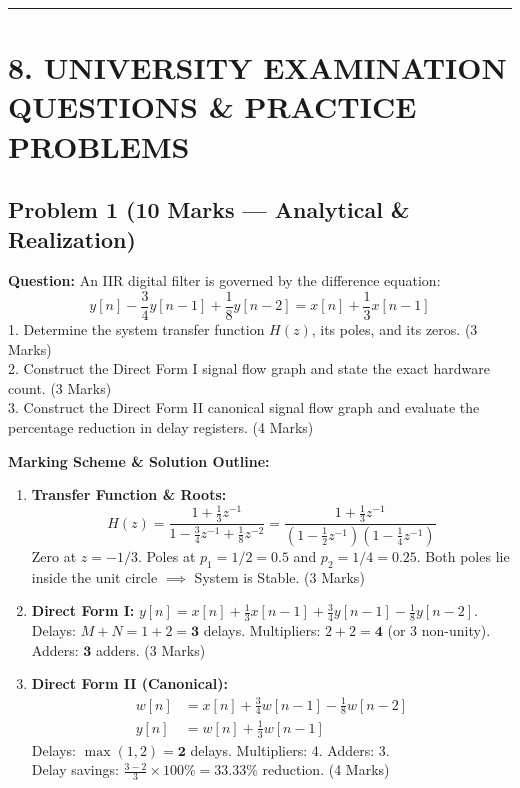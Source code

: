 \documentclass[11pt,a4paper]{article}
\begin{document}
\noindent\rule{\textwidth}{0.5pt}

\section{8. UNIVERSITY EXAMINATION QUESTIONS \& PRACTICE PROBLEMS}

\subsection{Problem 1 (10 Marks — Analytical \& Realization)}
\textbf{Question:} 
An IIR digital filter is governed by the difference equation:
\begin{equation}
y[n] - \frac{3}{4} y[n-1] + \frac{1}{8} y[n-2] = x[n] + \frac{1}{3} x[n-1]
\end{equation}
1. Determine the system transfer function $H(z)$, its poles, and its zeros. (3 Marks) \\
2. Construct the Direct Form I signal flow graph and state the exact hardware count. (3 Marks) \\
3. Construct the Direct Form II canonical signal flow graph and evaluate the percentage reduction in delay registers. (4 Marks)

\vspace{0.2cm}
\noindent\textbf{Marking Scheme \& Solution Outline:}
\begin{enumerate}
    \item \textbf{Transfer Function \& Roots:}
    \begin{equation}
    H(z) = \frac{1 + \frac{1}{3} z^{-1}}{1 - \frac{3}{4} z^{-1} + \frac{1}{8} z^{-2}} = \frac{1 + \frac{1}{3} z^{-1}}{\left(1 - \frac{1}{2} z^{-1}\right)\left(1 - \frac{1}{4} z^{-1}\right)}
    \end{equation}
    Zero at $z = -1/3$. Poles at $p_1 = 1/2 = 0.5$ and $p_2 = 1/4 = 0.25$. Both poles lie inside the unit circle $\implies$ System is Stable. (3 Marks)
    \item \textbf{Direct Form I:}
    $y[n] = x[n] + \frac{1}{3} x[n-1] + \frac{3}{4} y[n-1] - \frac{1}{8} y[n-2]$. \\
    Delays: $M + N = 1 + 2 = \mathbf{3}$ delays. Multipliers: $2 + 2 = \mathbf{4}$ (or 3 non-unity). Adders: $\mathbf{3}$ adders. (3 Marks)
    \item \textbf{Direct Form II (Canonical):}
    \begin{align*}
    w[n] &= x[n] + \frac{3}{4} w[n-1] - \frac{1}{8} w[n-2] \\
    y[n] &= w[n] + \frac{1}{3} w[n-1]
    \end{align*}
    Delays: $\max(1, 2) = \mathbf{2}$ delays. Multipliers: 4. Adders: 3. \\
    Delay savings: $\frac{3 - 2}{3} \times 100\% = \mathbf{33.33\%}$ reduction. (4 Marks)
\end{enumerate}
\end{document}
